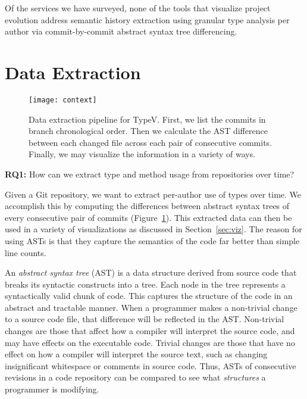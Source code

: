 Of the services we have surveyed, none of the tools that visualize project evolution address semantic history extraction using granular type analysis per author via commit-by-commit abstract syntax tree differencing.

\section{Data Extraction}
\label{sec:methodology}

\begin{figure}[!h]
\centering
\texttt{[image: context]}
\caption{Data extraction pipeline for TypeV. First, we list the commits in branch chronological order. Then we calculate the AST difference between each changed file across each pair of consecutive commits. Finally, we may visualize the information in a variety of ways.}
\label{fig:context}
\end{figure}

\textbf{RQ1:} How can we extract type and method usage from repositories over time?

Given a Git repository, we want to extract per-author use of types over time. We accomplish this by computing the differences between abstract syntax trees of every consecutive pair of commits (Figure~\ref{fig:context}). This extracted data can then be used in a variety of visualizations as discussed in Section~\ref{sec:viz}. The reason for using ASTs is that they capture the semantics of the code far better than simple line counts.

An \emph{abstract syntax tree} (AST) is a data structure derived from source code that breaks its syntactic constructs into a tree. Each node in the tree represents a syntactically valid chunk of code. This captures the structure of the code in an abstract and tractable manner. When a programmer makes a non-trivial change to a source code file, that difference will be reflected in the AST\@. Non-trivial changes are those that affect how a compiler will interpret the source code, and may have effects on the executable code. Trivial changes are those that have no effect on how a compiler will interpret the source text, such as changing insignificant whitespace or comments in source code. Thus, ASTs of consecutive revisions in a code repository can be compared to see what \emph{structures} a programmer is modifying.


